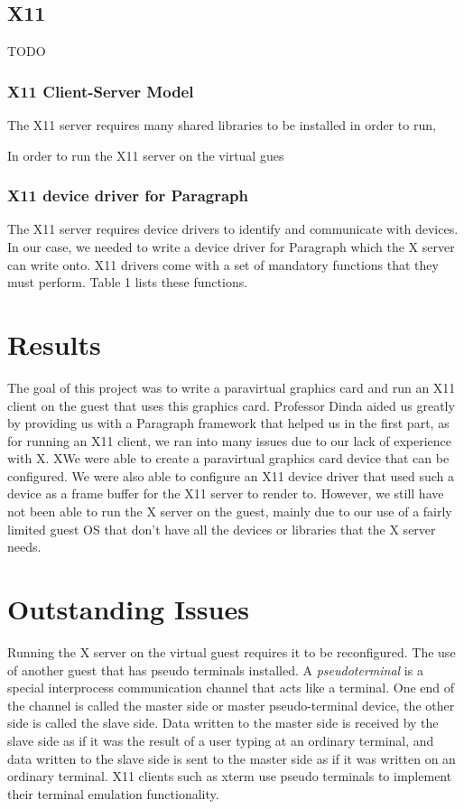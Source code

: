 \documentclass{acm_proc_article-sp}
\begin{document}
\subsection{X11}
 TODO
\subsubsection{X11 Client\--Server Model}
The X11 server requires many shared libraries to be installed in order to run,

 In order to run the X11 server on the virtual gues
\subsubsection{X11 device driver for Paragraph}
The X11 server requires device drivers to identify and communicate with devices.
In our case, we needed to write a device driver for Paragraph which the X server can
write onto.
X11 drivers come with a set of mandatory functions that they must perform. Table
1 lists these functions.
\section{Results}
The goal of this project was to write a paravirtual graphics card and run an X11
client on the guest that uses this graphics card. Professor Dinda aided us
greatly by providing us with a Paragraph framework that helped us in the first
part, as for running an X11 client, we ran into many issues due to our lack of
experience with X. XWe were able to create a paravirtual graphics card device
that can be configured. 
We were also able to configure an X11 device driver that used such a device as a
frame buffer for the X11 server to render to. However, we still have not been able to run
the X server on the guest, mainly due to our use of a fairly limited guest OS
that don't have all the devices or libraries that the X server needs.
\section{Outstanding Issues}
Running the X server on the virtual guest requires it to be reconfigured. The
use of another guest that has pseudo terminals installed. A
\textit{pseudo\textunderscore terminal} is a special interprocess communication
channel that acts like a terminal. One end of the channel is called the master side or master pseudo-terminal device, 
the other side is called the slave side. 
Data written to the master side is received by the slave side as if it was the result of a user typing at an ordinary terminal, 
and data written to the slave side is sent to the master side as if it was written on an ordinary terminal.
X11 clients such as xterm use pseudo terminals to implement their terminal emulation functionality.
\end{document}
